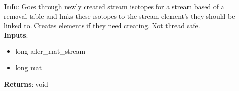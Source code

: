 \textbf{Info}: Goes through newly created stream isotopes for a stream based of
a removal table and links these isotopes to the stream element's they should be
linked to. Creates elements if they need creating. Not thread safe. \\

\noindent \textbf{Inputs}:
\begin{itemize}
\item{long ader\_mat\_stream}
\item{long mat}
\end{itemize}

\noindent \textbf{Returns}: void
